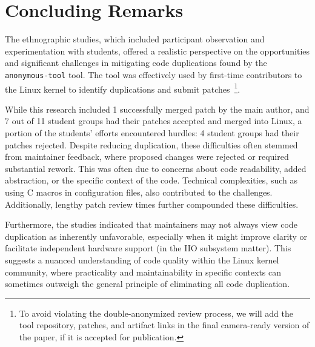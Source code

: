 \documentclass[12pt]{article}
\begin{document}
\section{Concluding Remarks}

The ethnographic studies, which included participant observation and experimentation with students, offered a realistic perspective on the opportunities and significant challenges in mitigating code duplications found by the \texttt{anonymous-tool} tool. The tool was effectively used by first-time contributors to the Linux kernel to identify duplications and submit patches~\footnote{To avoid violating the double-anonymized review process, we will add the tool repository, patches, and artifact links in the final camera-ready version of the paper, if it is accepted for publication.}.

While this research included 1 successfully merged patch by the main author, and 7 out of 11 student groups had their patches accepted and merged into Linux, a portion of the students' efforts encountered hurdles: 4 student groups had their patches rejected.
Despite reducing duplication, these difficulties often stemmed from maintainer feedback, where proposed changes were rejected or required substantial rework. This was often due to concerns about code readability, added abstraction, or the specific context of the code. Technical complexities, such as using C macros in configuration files, also contributed to the challenges. Additionally, lengthy patch review times further compounded these difficulties.

Furthermore, the studies indicated that maintainers may not always view code duplication as inherently unfavorable, especially when it might improve clarity or facilitate independent hardware support (in the IIO subsystem matter). This suggests a nuanced understanding of code quality within the Linux kernel community, where practicality and maintainability in specific contexts can sometimes outweigh the general principle of eliminating all code duplication.




\newpage


\end{document}

